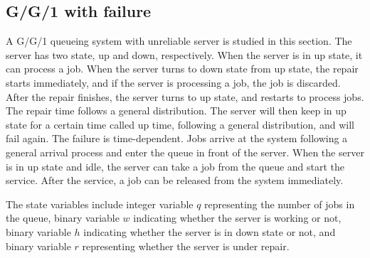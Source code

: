 \documentclass[]{interact}
\theoremstyle{plain}%
\theoremstyle{definition}
\theoremstyle{remark}
\begin{document}
\subsection{G/G/1 with failure}
A G/G/1 queueing system with unreliable server is studied in this section. The server has two state, up and down, respectively. When the server is in up state, it can process a job. When the server turns to down state from up state, the repair starts immediately, and if the server is processing a job, the job is discarded. After the repair finishes, the server turns to up state, and restarts to process jobs. The repair time follows a general distribution. The server will then keep in up state for a certain time called up time, following a general distribution, and will fail again. The failure is time-dependent. Jobs arrive at the system following a general arrival process and enter the queue in front of the server. When the server is in up state and idle, the server can take a job from the queue and start the service. After the service, a job can be released from the system immediately.

The state variables include integer variable $q$ representing the number of jobs in the queue, binary variable $w$ indicating whether the server is working or not, binary variable $h$ indicating whether the server is in down state or not, and binary variable $r$ representing whether the server is under repair.
\end{document}

